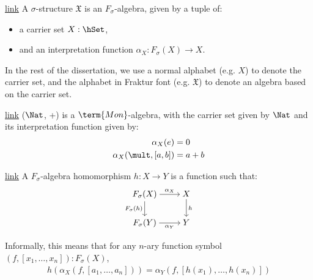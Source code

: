 \begin{definition}{\href{https://windtfw.com/agda-symmetries/Cubical.Structures.Str.html#555}{link}}\label{algebra:struct}
    A $\sigma$-structure $\mathfrak{X}$ is an $F_\sigma$-algebra, given by a tuple
    of:
    \begin{itemize}
        \item a carrier set $X : \hSet$,
        \item and an interpretation function $\alpha_X : F_\sigma(X) \to X$.
    \end{itemize}
\end{definition}

In the rest of the dissertation, we use a normal alphabet
(e.g. $X$) to denote the carrier set, and the alphabet in Fraktur font
(e.g. $\mathfrak{X}$) to denote an algebra based on the carrier set.

\begin{example}{\href{https://windtfw.com/agda-symmetries/Cubical.Structures.Set.Desc.Mon.html#6276}{link}}
($\Nat$, +) is a $\term{Mon}$-algebra, with
the carrier set given by $\Nat$ and its interpretation function given by:
\begin{align*}
    \alpha_X(e) & = 0 \\
    \alpha_X(\mult, [a, b]) & = a + b
\end{align*}
\end{example}

\begin{definition}{\href{https://windtfw.com/agda-symmetries/Cubical.Structures.Str.html#1013}{link}}
    A $F_\sigma$-algebra homomorphism $h: X \rightarrow Y$ is a function such that:
\[\begin{tikzcd}[ampersand replacement=\&,cramped]
	{F_{\sigma}(X)} \& X \\
	{F_{\sigma}(Y)} \& Y
	\arrow["{\alpha_X}", from=1-1, to=1-2]
	\arrow["{F_{\sigma}(h)}"', from=1-1, to=2-1]
	\arrow["{\alpha_Y}"', from=2-1, to=2-2]
	\arrow["h", from=1-2, to=2-2]
\end{tikzcd}\]
\end{definition}

Informally, this means that for any $n$-ary function symbol $(f, [x_1, \dots, x_n]) : F_{\sigma}(X)$,
\begin{align*}
    h(\alpha_X(f, [a_1, \dots, a_n])) = \alpha_Y(f, [h(x_1), \dots, h(x_n)])
\end{align*}

